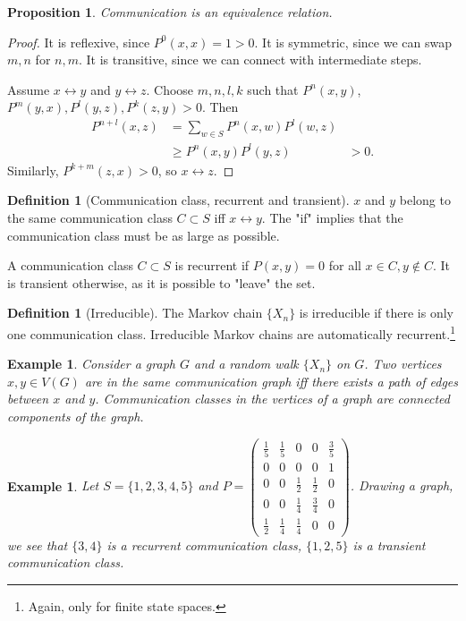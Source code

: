\documentclass{tufte-handout}
\newtheorem{ex}[thm]{Example}
\newtheorem{prop}[thm]{Proposition}
\theoremstyle{definition}
\newtheorem{defn}[thm]{Definition}
\begin{document}
\begin{prop}
	Communication is an equivalence relation.
\end{prop}

\begin{proof}
	It is reflexive, since $P^0(x,x) = 1 > 0$. It is symmetric, since we can swap $m,n$ for $n,m$. It is transitive, since we can connect with intermediate steps.

	Assume $x \leftrightarrow y$ and $y \leftrightarrow z$. Choose $m,n,l,k$ such that $P^n(x,y)$, $P^m(y,x), P^l(y,z), P^k(z,y) > 0$.
	Then 
	\begin{align*}
		P^{n+l}(x,z) &= \sum\limits_{w\in S}^{} P^n(x,w) P^l(w,z) \\
					 &\ge P^n(x,y) P^l(y,z)
					 &> 0
	.\end{align*}
	Similarly, $P^{k+m}(z,x) > 0$, so $x \leftrightarrow z$.
\end{proof}

\begin{defn}[Communication class, recurrent and transient]
	$x$ and $y$ belong to the same communication class $C \subset S$ iff $x \leftrightarrow y$. The "if" implies that the communication class must be as large as possible.

	A communication class $C \subset S$ is recurrent if $P(x,y) = 0$ for all $x \in C, y \not\in C$. It is transient otherwise, as it is possible to "leave" the set.
\end{defn}

\begin{defn}[Irreducible]
	The Markov chain $\{X_n\}$ is irreducible if there is only one communication class. Irreducible Markov chains are automatically recurrent.\footnote{Again, only for finite state spaces.}
\end{defn}

\begin{ex}
	Consider a graph $G$ and a random walk $\{X_n\}$ on $G$. Two vertices $x,y \in V(G)$ are in the same communication graph iff there exists a path of edges between $x$ and $y$. Communication classes in the vertices of a graph are connected components of the graph.
\end{ex}

\begin{ex}
	Let $S = \{1,2,3,4,5\}$ and $P = \begin{pmatrix}
		\frac{1}{5} & \frac{1}{5} & 0 & 0 & \frac{3}{5} \\
		0 & 0 & 0 & 0 & 1 \\
		0 & 0 & \frac{1}{2} & \frac{1}{2} & 0 \\
		0 & 0 & \frac{1}{4} & \frac{3}{4} & 0 \\
		\frac{1}{2} & \frac{1}{4} & \frac{1}{4} & 0 & 0
	\end{pmatrix} $.
	Drawing a graph, we see that $\{3,4\}$ is a recurrent communication class, $\{1,2,5\}$ is a transient communication class.
\end{ex}
\end{document}
